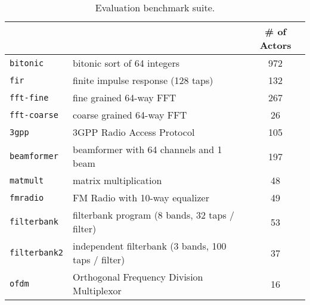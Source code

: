 \begin{table}[t]
\vspace{6pt}
\nocaptionrule
\center
\label{tab:benchmarks}
{\scriptsize
\begin{tabular}{|l|l|c|} \hline
\hspace{-2pt}{\bf Benchmark}&\hspace{-2pt}{\bf Description}& \hspace{-6pt} {\bf \# of Actors} \hspace{-6pt} \\ \hline \hline
\hspace{-2pt}\texttt{bitonic	} &\hspace{-2pt}bitonic sort of 64 integers	&	972 \\ \hline
\hspace{-2pt}\texttt{fir	      } &\hspace{-2pt} finite impulse response (128 taps)&	132 \\ \hline
\hspace{-2pt}\texttt{fft-fine	} &\hspace{-2pt}fine grained 64-way FFT	&	267 \\ \hline
\hspace{-2pt}\texttt{fft-coarse}\hspace{-2pt} &\hspace{-2pt}coarse grained 64-way FFT	&	26 \\ \hline
\hspace{-2pt}\texttt{3gpp	} &\hspace{-2pt}3GPP Radio Access Protocol	&	105 \\ \hline
\hspace{-2pt}\texttt{beamformer} & \hspace{-2pt}beamformer with 64 channels and 1 beam & 197 \\ \hline
\hspace{-2pt}\texttt{matmult	} & \hspace{-2pt}matrix multiplication	&	48 \\ \hline
\hspace{-2pt}\texttt{fmradio	} & \hspace{-2pt}FM Radio with 10-way equalizer	&	49 \\ \hline
\hspace{-2pt}\texttt{filterbank}\hspace{-2pt} & \hspace{-2pt}filterbank program (8 bands, 32 taps / filter)	&	53 \\ \hline
\hspace{-2pt}\texttt{filterbank2}\hspace{-3pt}& \hspace{-2pt}independent filterbank (3 bands, 100 taps / filter) &	37 \\ \hline
\hspace{-2pt}\texttt{ofdm	 }& \hspace{-2pt}Orthogonal Frequency Division Multiplexor~\cite{spectrumware}	&	16 \\ \hline
\end{tabular}
}
\caption{Evaluation benchmark suite.}
\vspace{6pt}
\end{table}

